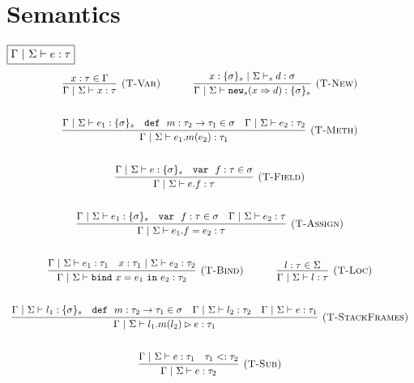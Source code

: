 \documentclass{llncs}
\newcommand{\keywadj}[1]{\mathtt{#1}}
\newcommand{\keyw}[1]{\keywadj{#1}~}
\begin{document}
\newpage

\section{Semantics}

$\fbox{$\Gamma~|~\Sigma \vdash e : \tau$}$
\[
\begin{array}{c}
\infer[\textsc{(T-Var)}]
  {\Gamma~|~\Sigma \vdash x : \tau}
  {x : \tau \in \Gamma}%
~~~~~~~~~~
\infer[\textsc{(T-New)}]
	{\Gamma~|~\Sigma \vdash \keywadj{new}_{s}(x \Rightarrow d) : \{ \sigma \}_{s}}
	{x : \{ \sigma \}_{s}~|~\Sigma \vdash_s d : \sigma} \\[5ex]

\infer[\textsc{(T-Meth)}]
	{\Gamma~|~\Sigma \vdash e_1.m(e_2) : \tau_1} 
	{\Gamma~|~\Sigma \vdash e_1 : \{\sigma\}_s  & \keyw{def}~ m : \tau_2 \rightarrow \tau_1 \in \sigma & \Gamma~|~\Sigma \vdash e_2 : \tau_2}\\[5ex]

\infer[\textsc{(T-Field)}]
	{\Gamma~|~\Sigma \vdash  e.f : \tau} 
	{\Gamma~|~\Sigma \vdash e : \{\sigma\}_s & \keyw{var}~ f : \tau \in \sigma}\\[5ex]
	
\infer[\textsc{(T-Assign)}]
	{\Gamma~|~\Sigma \vdash  e_1.f=e_2 : \tau} 
	{\Gamma~|~\Sigma \vdash e_1 : \{\sigma\}_s & \keyw{var}~ f : \tau \in \sigma & \Gamma~|~\Sigma \vdash e_2 : \tau}\\[5ex]

\infer[\textsc{(T-Bind)}]
  {\Gamma~|~\Sigma \vdash \keyw{bind} x = e_1~\keyw{in} e_2 : \tau_2}
  {\Gamma~|~\Sigma \vdash e_1 : \tau_1 & x : \tau_1~|~\Sigma \vdash e_2 : \tau_2}%
~~~~~~~~~~
\infer[\textsc{(T-Loc)}]
  {\Gamma~|~\Sigma \vdash l : \tau}
  {l : \tau \in \Sigma}\\[5ex]

\infer[\textsc{(T-StackFrames)}]
	{\Gamma~|~\Sigma \vdash l_1.m(l_2) \rhd e : \tau_1}
	{\Gamma~|~\Sigma \vdash l_1 : \{\sigma\}_s & \keyw{def}~ m : \tau_2 \rightarrow \tau_1 \in \sigma & \Gamma~|~\Sigma \vdash l_2 : \tau_2 & \Gamma~|~\Sigma \vdash e : \tau_1} \\[5ex]

\infer[\textsc{(T-Sub)}]
  {\Gamma~|~\Sigma \vdash e : \tau_2}
  {\Gamma~|~\Sigma \vdash e : \tau_1 & \tau_1 <: \tau_2}\\[5ex]

\end{array}
\]
\end{document}
